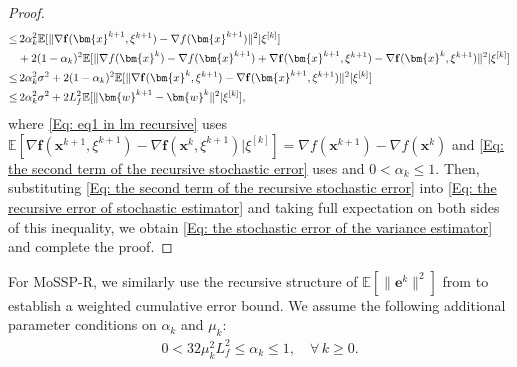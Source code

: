 \documentclass{article}
\theoremstyle{plain}
\theoremstyle{definition}
\theoremstyle{remark}
\newcommand{\EE}{\mathbb{E}}
\newcommand{\bx}{\bm{x}}
\newcommand{\be}{\bm{e}}
\newcommand{\bw}{\bm{w}}
\newcommand{\tf}{\mathbf{f}}
\numberwithin{equation}{section}
\begin{document}
\begin{proof}
\begin{align}
\leq&\, 2\alpha_{k}^{2}\EE[\| \nabla \tf(\bx^{k+1}, \xi^{k+1}) - \nabla f(\bx^{k+1})\|^{2}|\xi^{[k]}]\notag \\
     &+ 2(1 - \alpha_{k})^{2}\EE[\| \nabla f(\bx^{k}) - \nabla f(\bx^{k+1})+ \nabla \tf(\bx^{k+1}, \xi^{k+1}) - \nabla \tf(\bx^{k}, \xi^{k+1})\|^{2}|\xi^{[k]}] \notag \\
\leq&\, 2\alpha_{k}^{2}\sigma^{2} + 2(1 - \alpha_{k})^{2}\EE[\| \nabla \tf(\bx^{k}, \xi^{k+1}) - \nabla \tf(\bx^{k+1}, \xi^{k+1})\|^{2}|\xi^{[k]}] \label{Eq: eq1 in lm recursive} \\
\leq&\, 2\alpha_{k}^{2}\sigma^{2}+ 2L^2_{f} \EE [\| \bw^{k+1}- \bw^{k}\|^{2}| \xi^{[k]}], \label{Eq: the second term of the recursive stochastic error}
\end{align}
where \eqref{Eq: eq1 in lm recursive} uses
    $\EE\left[\nabla \tf(\bx^{k+1},\xi^{k+1}) - \nabla \tf(\bx^{k},\xi^{k+1}
    ) | \xi^{[k]} \right] = \nabla f(\bx^{k+1}) - \nabla f(\bx^{k})$
    and \eqref{Eq: the second term of the recursive stochastic error} uses  and $0 < \alpha_{k}\leq 1$. Then, substituting
    \eqref{Eq: the second term of the recursive stochastic error} into \eqref{Eq: the recursive error of stochastic estimator}
    and taking full expectation on both sides of this inequality, we obtain
    \eqref{Eq: the stochastic error of the variance estimator} and complete the proof.
\end{proof}
For MoSSP-R, we similarly use the recursive structure of $\EE [ \|\be^{k}\|^{2}]$ from  to establish a weighted cumulative error bound. We assume the following additional parameter conditions on $\alpha_k$ and \(\mu_k\):
\begin{align}
    \label{Eq: the additional parameters assumptions in storm}
    0 < 32 \mu_{k}^{2}L_f^{2}\leq \alpha_{k}\leq 1, \quad \forall\, k \geq 0.
\end{align}
\end{document}
